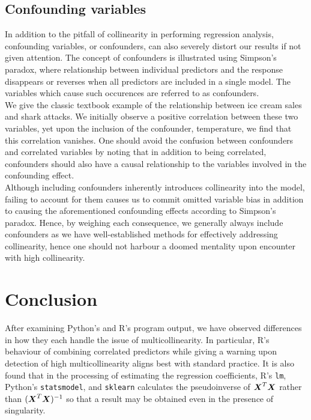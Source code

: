 \documentclass[12pt]{article}
\begin{document}
	\subsection{Confounding variables}
	
	In addition to the pitfall of collinearity in performing regression analysis, confounding variables, or confounders, can also severely distort our results if not given attention. The concept of confounders is illustrated using Simpson's paradox, where relationship between individual predictors and the response disappears or reverses when all predictors are included in a single model. The variables which cause such occurences are referred to as confounders.\\
	
	We give the classic textbook example of the relationship between ice cream sales and shark attacks. We initially observe a positive correlation between these two variables, yet upon the inclusion of the confounder, temperature, we find that this correlation vanishes. One should avoid the confusion between confounders and correlated variables by noting that in addition to being correlated, confounders should also have a causal relationship to the variables involved in the confounding effect.\\
	
	Although including confounders inherently introduces collinearity into the model, failing to account for them causes us to commit omitted variable bias in addition to causing the aforementioned confounding effects according to Simpson's paradox. Hence, by weighing each consequence, we generally always include confounders as we have well-established methods for effectively addressing collinearity, hence one should not harbour a doomed mentality upon encounter with high collinearity.
	
	\section{Conclusion}
	
	After examining Python's and R's program output, we have observed differences in how they each handle the issue of multicollinearity. In particular, R's behaviour of combining correlated predictors while giving a warning upon detection of high multicollinearity aligns best with standard practice. It is also found that in the processing of estimating the regression coefficients, R's \texttt{lm}, Python's \texttt{statsmodel}, and \texttt{sklearn} calculates the pseudoinverse of $\boldsymbol{X}^T\boldsymbol{X}$ rather than $(\boldsymbol{X}^T\boldsymbol{X})^{-1}$ so that a result may be obtained even in the presence of singularity.\\
	
\end{document}
